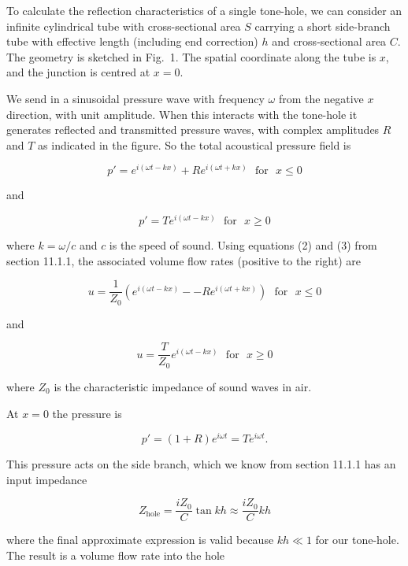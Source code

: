   To calculate the reflection characteristics of a single tone-hole, we can 
  consider an infinite cylindrical tube with cross-sectional area $S$ carrying 
  a short side-branch tube with effective length (including end correction) $h$ 
  and cross-sectional area $C$. The geometry is sketched in Fig.\ 1. The 
  spatial coordinate along the tube is $x$, and the junction is centred at 
  $x=0$. 


  We send in a sinusoidal pressure wave with frequency $\omega$ from the 
  negative $x$ direction, with unit amplitude. When this interacts with the 
  tone-hole it generates reflected and transmitted pressure waves, with complex 
  amplitudes $R$ and $T$ as indicated in the figure. So the total acoustical 
  pressure field is 

  $$p'=e^{i(\omega t -kx)} + R e^{i(\omega t +kx)} \mathrm{~~~for~~~}x \le 0 
  \tag{1}$$ 

  and 

  $$p'=T e^{i(\omega t -kx)} \mathrm{~~~for~~~}x \ge 0 \tag{2}$$ 

  where $k=\omega /c$ and $c$ is the speed of sound. Using equations (2) and 
  (3) from section 11.1.1, the associated volume flow rates (positive to the 
  right) are 

  $$u=\dfrac{1}{Z_0}\left(e^{i(\omega t -kx)} -- R e^{i(\omega t +kx)} \right) 
  \mathrm{~~~for~~~}x \le 0 \tag{3}$$ 

  and 

  $$u=\dfrac{T}{Z_0} e^{i(\omega t -kx)} \mathrm{~~~for~~~}x \ge 0 \tag{4}$$ 

  where $Z_0$ is the characteristic impedance of sound waves in air. 

  At $x=0$ the pressure is 

  $$p'=(1+R)e^{i \omega t} = Te^{i \omega t} . \tag{5}$$ 

  This pressure acts on the side branch, which we know from section 11.1.1 has 
  an input impedance 

  $$Z_{\mathrm{hole}}=\dfrac{i Z_0}{C} \tan kh \approx \dfrac{i Z_0}{C} kh 
  \tag{6}$$ 

  where the final approximate expression is valid because $kh \ll 1$ for our 
  tone-hole. The result is a volume flow rate into the hole 

